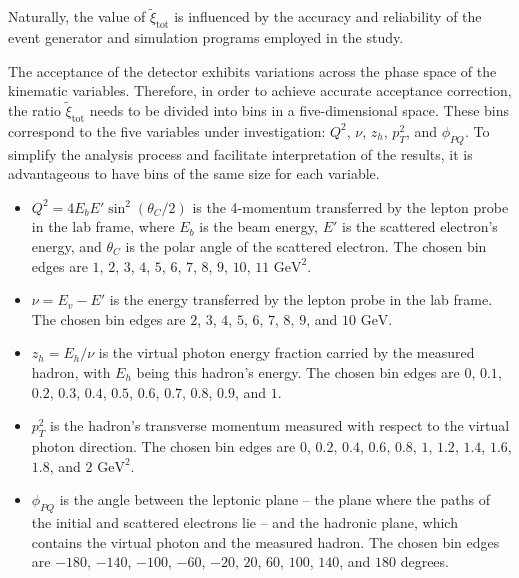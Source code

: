     Naturally, the value of $\tilde\xi_\text{tot}$ is influenced by the accuracy and reliability of the event generator and simulation programs employed in the study.

    The acceptance of the detector exhibits variations across the phase space of the kinematic variables.
    Therefore, in order to achieve accurate acceptance correction, the ratio $\tilde\xi_\text{tot}$ needs to be divided into bins in a five-dimensional space.
    These bins correspond to the five variables under investigation: $Q^2$, $\nu$, $z_h$, $p_T^2$, and $\phi_{PQ}$.
    To simplify the analysis process and facilitate interpretation of the results, it is advantageous to have bins of the same size for each variable.

    \begin{itemize}
        \item
            $Q^2 = 4E_bE'\sin^2(\theta_C/2)$ is the 4-momentum transferred by the lepton probe in the lab frame, where $E_b$ is the beam energy, $E'$ is the scattered electron's energy, and $\theta_C$ is the polar angle of the scattered electron.
            The chosen bin edges are $1$, $2$, $3$, $4$, $5$, $6$, $7$, $8$, $9$, $10$, $11$ $\text{GeV}^2$.
        \item
            $\nu = E_v - E'$ is the energy transferred by the lepton probe in the lab frame.
            The chosen bin edges are $2$, $3$, $4$, $5$, $6$, $7$, $8$, $9$, and $10$ $\text{GeV}$.
        \item
            $z_h = E_h/\nu$ is the virtual photon energy fraction carried by the measured hadron, with $E_h$ being this hadron's energy.
            The chosen bin edges are $0$, $0.1$, $0.2$, $0.3$, $0.4$, $0.5$, $0.6$, $0.7$, $0.8$, $0.9$, and $1$.
        \item
            $p_T^2$ is the hadron's transverse momentum measured with respect to the virtual photon direction.
            The chosen bin edges are $0$, $0.2$, $0.4$, $0.6$, $0.8$, $1$, $1.2$, $1.4$, $1.6$, $1.8$, and $2$ $\text{GeV}^2$.
        \item
            $\phi_{PQ}$ is the angle between the leptonic plane -- the plane where the paths of the initial and scattered electrons lie -- and the hadronic plane, which contains the virtual photon and the measured hadron.
            The chosen bin edges are $-180$, $-140$, $-100$, $-60$, $-20$, $20$, $60$, $100$, $140$, and $180$ degrees.
    \end{itemize}

